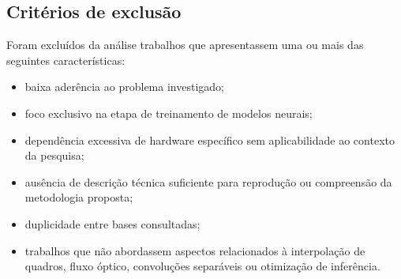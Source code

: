 \documentclass[
    12pt,                %
    openright,           %
    oneside,             %
    a4paper,             %
    english,             %
    brazil               %
]{abntex2}
\begin{document}
\subsection{Critérios de exclusão}

Foram excluídos da análise trabalhos que apresentassem uma ou mais das seguintes características:

\begin{itemize}
    \item baixa aderência ao problema investigado;
    \item foco exclusivo na etapa de treinamento de modelos neurais;
    \item dependência excessiva de hardware específico sem aplicabilidade ao contexto da pesquisa;
    \item ausência de descrição técnica suficiente para reprodução ou compreensão da metodologia proposta;
    \item duplicidade entre bases consultadas;
    \item trabalhos que não abordassem aspectos relacionados à interpolação de quadros, fluxo óptico, convoluções separáveis ou otimização de inferência.
\end{itemize}


\end{document}
